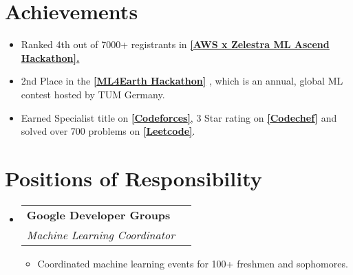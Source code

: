\documentclass[letterpaper,11pt]{article}
\makeatletter
\newcommand{\resumeItem}[1]{
  \item\small{
    {#1 \vspace{-2pt}}
  }
}
\newcommand{\resumeSubheading}[4]{
  \vspace{-2pt}\item
    \begin{tabular*}{1.0\textwidth}[t]{l@{\extracolsep{\fill}}r}
      \textbf{#1} & \textbf{\small #2} \\
      \textit{\small#3} & \textit{\small #4} \\
    \end{tabular*}\vspace{-7pt}
}
\newcommand{\resumeSubHeadingListStart}{\begin{itemize}[leftmargin=0.0in, label={}]}
\newcommand{\resumeSubHeadingListEnd}{\end{itemize}}
\newcommand{\resumeItemListStart}{\begin{itemize}}
\newcommand{\resumeItemListEnd}{\end{itemize}\vspace{-5pt}}
\makeatother
\begin{document}
\section{Achievements}
\small
    \begin{itemize}
        \item {Ranked 4th out of 7000+ registrants in \textbf{\href{https://www.hackerearth.com/challenges/new/competitive/zelestra-x-aws-ml-ascend-challenge-second-edition/}{[\underline{AWS x Zelestra ML Ascend Hackathon}].}}}
        
        \item {2nd Place in the \href{https://devpost.com/software/ml4earth-2024-bmgjih}{\textbf{[\underline{ML4Earth Hackathon}]}} , which is an annual, global ML contest hosted by TUM Germany.}
        
        \item {Earned Specialist title on \textbf{\href{https://codeforces.com/profile/hydro_7}{[\underline{Codeforces}]}}, 3 Star rating on \textbf{\href{https://www.codechef.com/users/hydro_7}{[\underline{Codechef}]}} and solved over 700 problems on \href{https://leetcode.com/u/hydro_7/}{\textbf{[\underline{Leetcode}]}}.}
    \end{itemize}

\vspace{-14pt}
\section{Positions of Responsibility}
    \resumeSubHeadingListStart
        \resumeSubheading{Google Developer Groups}{}{Machine Learning Coordinator}{}
            \resumeItemListStart
                \resumeItem{Coordinated machine learning events for 100+ freshmen and sophomores. }
                
            \resumeItemListEnd
        
    \resumeSubHeadingListEnd
\end{document}
